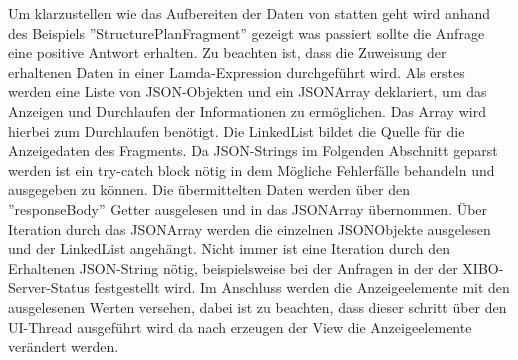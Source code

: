 Um klarzustellen wie das Aufbereiten der Daten von statten geht wird anhand des Beispiels ''StructurePlanFragment'' gezeigt was passiert sollte die Anfrage eine positive Antwort erhalten. Zu beachten ist, dass die Zuweisung der erhaltenen Daten in einer Lamda-Expression durchgeführt wird. Als erstes werden eine Liste von JSON-Objekten und ein JSONArray deklariert, um das Anzeigen und Durchlaufen der Informationen zu ermöglichen. Das Array wird hierbei zum Durchlaufen benötigt. Die LinkedList bildet die Quelle für die Anzeigedaten des Fragments. Da JSON-Strings im Folgenden Abschnitt geparst werden ist ein try-catch block nötig in dem Mögliche Fehlerfälle behandeln und ausgegeben zu können. Die übermittelten Daten werden über den ''responseBody'' Getter ausgelesen und in das JSONArray übernommen. Über Iteration durch das JSONArray werden die einzelnen JSONObjekte ausgelesen und der LinkedList angehängt. Nicht immer ist eine Iteration durch den Erhaltenen JSON-String nötig, beispielsweise bei der Anfragen in der der XIBO-Server-Status festgestellt wird. Im Anschluss werden die Anzeigeelemente mit den ausgelesenen Werten versehen, dabei ist zu beachten, dass dieser schritt über den UI-Thread ausgeführt wird da nach erzeugen der View die Anzeigeelemente verändert werden. 
\\